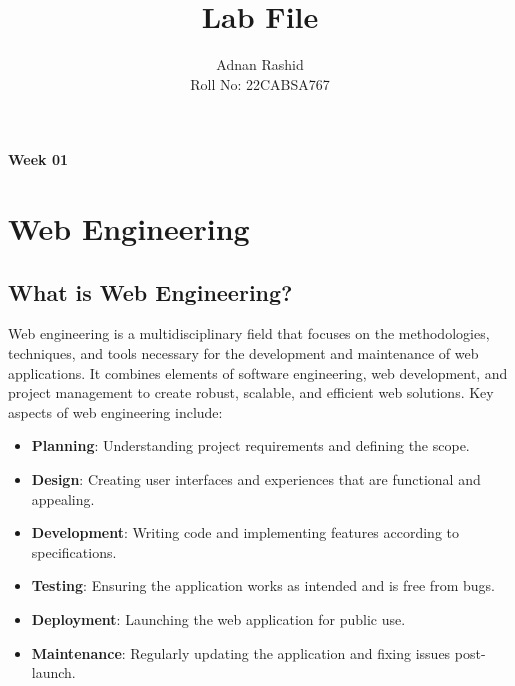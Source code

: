 \documentclass[a4paper,12pt]{article}
\title{\textbf{Lab File}\\}
\author{Adnan Rashid \\ Roll No: 22CABSA767}
\begin{document}
\maketitle
\thispagestyle{empty} %
\tableofcontents
\newpage

\setcounter{page}{1}

\begin{center}
    \vspace*{1cm}
    {\Huge \textbf{Week 01}} \\
    \vspace{0.5cm}
    \vspace{1cm}
\end{center}
\section{Web Engineering}

\subsection{What is Web Engineering?}

Web engineering is a multidisciplinary field that focuses on the methodologies, techniques, and tools necessary for the development and maintenance of web applications. It combines elements of software engineering, web development, and project management to create robust, scalable, and efficient web solutions. Key aspects of web engineering include:

\begin{itemize}
    \item \textbf{Planning}: Understanding project requirements and defining the scope.
    \item \textbf{Design}: Creating user interfaces and experiences that are functional and appealing.
    \item \textbf{Development}: Writing code and implementing features according to specifications.
    \item \textbf{Testing}: Ensuring the application works as intended and is free from bugs.
    \item \textbf{Deployment}: Launching the web application for public use.
    \item \textbf{Maintenance}: Regularly updating the application and fixing issues post-launch.
\end{itemize}
\end{document}
